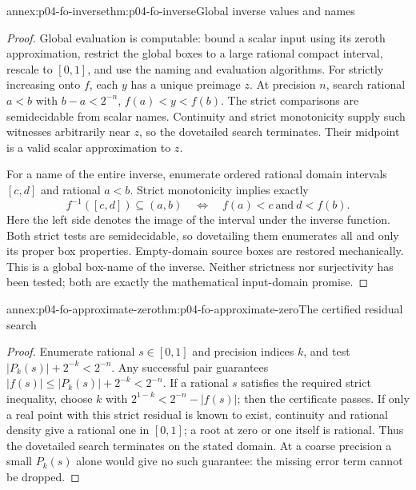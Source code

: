 \begin{annexitem}{annex:p04-fo-inverse}{thm:p04-fo-inverse}{Global inverse values and names}
\begin{proof}
Global evaluation is computable: bound a scalar input using
its zeroth approximation, restrict the global boxes to a
large rational compact interval, rescale to \([0,1]\),
and use the naming and evaluation algorithms.
For strictly increasing onto \(f\), each \(y\) has a unique
preimage \(z\). At precision \(n\), search rational \(a<b\)
with \(b-a<2^{-n}\), \(f(a)<y<f(b)\).
The strict comparisons are semidecidable from scalar names.
Continuity and strict monotonicity supply such witnesses
arbitrarily near \(z\), so the dovetailed search terminates.
Their midpoint is a valid scalar approximation to \(z\).

For a name of the entire inverse, enumerate ordered rational
domain intervals \([c,d]\) and rational \(a<b\).
Strict monotonicity implies exactly
\[
 f^{-1}([c,d])\subseteq(a,b)
 \quad\Longleftrightarrow\quad f(a)<c\ \text{and}\ d<f(b).
\]
Here the left side denotes the image of the interval under
the inverse function. Both strict tests are semidecidable,
so dovetailing them enumerates all and only its proper
box properties. Empty-domain source boxes are restored
mechanically. This is a global box-name of the inverse.
Neither strictness nor surjectivity has been tested; both
are exactly the mathematical input-domain promise.
\end{proof}
\end{annexitem}

\begin{annexitem}{annex:p04-fo-approximate-zero}{thm:p04-fo-approximate-zero}{The certified residual search}
\begin{proof}
Enumerate rational \(s\in[0,1]\) and precision indices \(k\),
and test \(|P_k(s)|+2^{-k}<2^{-n}\).
Any successful pair guarantees
 \(|f(s)|\leq|P_k(s)|+2^{-k}<2^{-n}\).
If a rational \(s\) satisfies the required strict inequality,
choose \(k\) with \(2^{1-k}<2^{-n}-|f(s)|\);
then the certificate passes.
If only a real point with this strict residual is known to
exist, continuity and rational density give a rational one
in \([0,1]\); a root at zero or one itself is rational.
Thus the dovetailed search terminates on the stated domain.
At a coarse precision a small \(P_k(s)\) alone would give
no such guarantee: the missing error term cannot be dropped.
\end{proof}
\end{annexitem}

